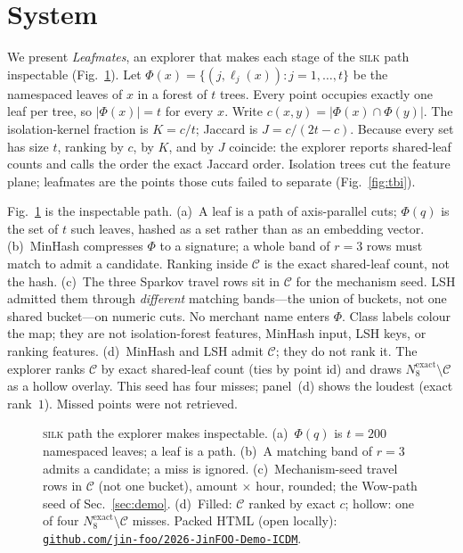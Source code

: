\documentclass[conference]{IEEEtran}
\newcommand{\silk}{\textsc{silk}}
\newcommand{\sys}{\emph{Leafmates}}
\begin{document}
\section{System}
\label{sec:system}

We present \sys{}, an explorer that makes each stage of the \silk{} path inspectable (Fig.~\ref{fig:pipe}). Let $\Phi(x)=\{(j,\ell_j(x)):j=1,\ldots,t\}$ be the namespaced leaves of $x$ in a forest of $t$ trees. Every point occupies exactly one leaf per tree, so $|\Phi(x)|=t$ for every $x$. Write $c(x,y)=|\Phi(x)\cap\Phi(y)|$. The isolation-kernel fraction is $K=c/t$; Jaccard is $J=c/(2t-c)$. Because every set has size $t$, ranking by $c$, by $K$, and by $J$ coincide: the explorer reports shared-leaf counts and calls the order the exact Jaccard order. Isolation trees cut the feature plane; leafmates are the points those cuts failed to separate (Fig.~\ref{fig:tbi}).

Fig.~\ref{fig:pipe} is the inspectable path. (a)~A leaf is a path of axis-parallel cuts; $\Phi(q)$ is the set of $t$ such leaves, hashed as a set rather than as an embedding vector. (b)~MinHash compresses $\Phi$ to a signature; a whole band of $r{=}3$ rows must match to admit a candidate. Ranking inside $\mathcal{C}$ is the exact shared-leaf count, not the hash. (c)~The three Sparkov travel rows sit in $\mathcal{C}$ for the mechanism seed. LSH admitted them through \emph{different} matching bands---the union of buckets, not one shared bucket---on numeric cuts. No merchant name enters $\Phi$. Class labels colour the map; they are not isolation-forest features, MinHash input, LSH keys, or ranking features. (d)~MinHash and LSH admit $\mathcal{C}$; they do not rank it. The explorer ranks $\mathcal{C}$ by exact shared-leaf count (ties by point id) and draws $N^{\mathrm{exact}}_8\setminus\mathcal{C}$ as a hollow overlay. This seed has four misses; panel~(d) shows the loudest (exact rank~$1$). Missed points were not retrieved.

\begin{figure}[t]
\centering

\caption{\silk{} path the explorer makes inspectable. (a)~$\Phi(q)$ is $t{=}200$ namespaced leaves; a leaf is a path. (b)~A matching band of $r{=}3$ admits a candidate; a miss is ignored. (c)~Mechanism-seed travel rows in $\mathcal{C}$ (not one bucket), amount ${\times}$ hour, rounded; the Wow-path seed of Sec.~\ref{sec:demo}. (d)~Filled: $\mathcal{C}$ ranked by exact $c$; hollow: one of four $N^{\mathrm{exact}}_8\setminus\mathcal{C}$ misses. Packed HTML (open locally): \href{https://github.com/jin-foo/2026-JinFOO-Demo-ICDM}{\texttt{github.com/jin-foo/2026-JinFOO-Demo-ICDM}}.}
\label{fig:pipe}
\end{figure}
\end{document}
